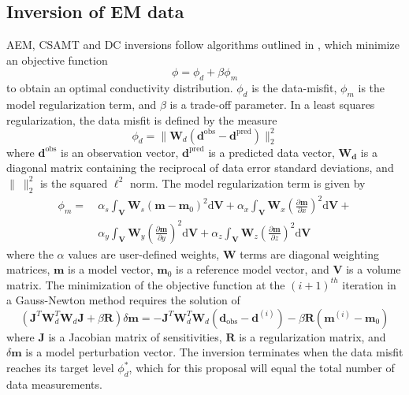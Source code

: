 \documentclass[letterpaper,11pt]{article}
\begin{document}
\subsection{Inversion of EM data}
AEM, CSAMT and DC inversions follow algorithms outlined in \cite{Oldenburg1994,Haber2004,Haber2007,Oldenburg2013,Haber2014}, which minimize an objective function
\begin{equation}
\phi = \phi_d + \beta \phi_m
\label{eq:objectiveFunction}
\end{equation}
to obtain an optimal conductivity distribution. $\phi_d$ is the data-misfit, $\phi_m$ is the model regularization term, and $\beta$ is a trade-off parameter. In a least squares regularization, the data misfit is defined by the measure
\begin{equation}
\phi_d = \|\mathbf{W}_d(\mathbf{d}^{\mathrm{obs}} - \mathbf{d}^{\mathrm{pred}}) \|^2_2
\label{eq:dataMisfit}
\end{equation}
where $\mathbf{d}^{\mathrm{obs}}$ is an observation vector, $\mathbf{d}^{\mathrm{pred}}$ is a predicted data vector, $\mathbf{W_d}$ is a diagonal matrix containing the reciprocal of data error standard deviations, and $\|\ \|^{2}_2$ is the squared $\ell^2$ norm. The model regularization term is given by 
\begin{align}
 \phi_m = \ &\alpha_{s} \int_{\mathbf{V}} \mathbf{W}_{s}(\mathbf{m}-\mathbf{m}_0)^{2}\mathrm{d}\mathbf{V} + \alpha_{x} \int_{\mathbf{V}} \mathbf{W}_{x} \left (\frac{\partial{\mathbf{m}}}{\partial{x}} \right)^2 \mathrm{d}\mathbf{V} + \nonumber \\ &\alpha_{y} \int_{\mathbf{V}} \mathbf{W}_{y} \left (\frac{\partial{\mathbf{m}}}{\partial{y}} \right)^2 \mathrm{d}\mathbf{V} + 
 \alpha_{z} \int_{\mathbf{V}} \mathbf{W}_{z} \left (\frac{\partial{\mathbf{m}}}{\partial{z}} \right)^2 \mathrm{d}\mathbf{V} 
 \end{align}
 where the $ \alpha $ values are user-defined weights, $ \mathbf{W} $ terms are diagonal weighting matrices, $ \mathbf{m} $ is a model vector, $ \mathbf{m}_0 $ is a reference model vector, and $ \mathbf{V} $ is a volume matrix.
The minimization of the objective function at the $(i+1)^{th}$ iteration in a Gauss-Newton method requires the solution of
\begin{equation}
(\mathbf{J}^T \mathbf{W}_d^T \mathbf{W}_d \mathbf{J} + \beta \mathbf{R}) \delta \mathbf{m} = -\mathbf{J}^T \mathbf{W}_d^T \mathbf{W}_d(\mathbf{d}_{\mathrm{obs}} - \mathbf{d}^{(i)}) - \beta \mathbf{R}
(\mathbf{m}^{(i)} - \mathbf{m}_0)
\label{eq:GaussNewton}
\end{equation}
where $\mathbf{J}$ is a Jacobian matrix of sensitivities, $\mathbf{R}$ is a regularization matrix, and $\delta \mathbf{m}$ is a model perturbation vector. The inversion terminates when the data misfit reaches its target level $ \phi_d^* $, which for this proposal will equal the total number of data measurements.
\end{document}
